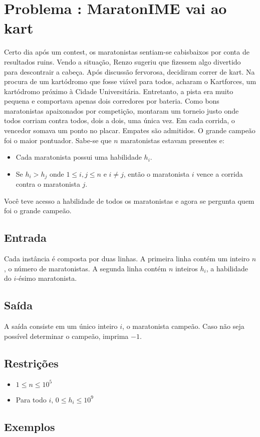 \section*{Problema \proxLetra: MaratonIME vai ao kart}

Certo dia após um contest, os maratonistas sentiam-se cabisbaixos por conta de resultados ruins. Vendo a situação, Renzo sugeriu que fizessem algo divertido para descontrair a cabeça. Após discussão fervorosa, decidiram correr de kart. Na procura de um kartódromo que fosse viável para todos, acharam o Kartforces, um kartódromo próximo à Cidade Universitária. Entretanto, a pista era muito pequena e comportava apenas dois corredores por bateria. Como bons maratonistas apaixonados por competição, montaram um torneio justo onde todos corriam contra todos, dois a dois, uma única vez. Em cada corrida, o vencedor somava um ponto no placar. Empates são admitidos. O grande campeão foi o maior pontuador. Sabe-se que $n$ maratonistas estavam presentes e:

\begin{itemize}
	\item Cada maratonista possui uma habilidade $h_i$.
	\item Se $h_i > h_j$ onde $1 \leq i,j \leq n$ e $i \neq j$, então o maratonista $i$ vence a corrida contra o maratonista $j$.
\end{itemize}

Você teve acesso a habilidade de todos os maratonistas e agora se pergunta quem foi o grande campeão.

\subsection*{Entrada}

Cada instância é composta por duas linhas. 
A primeira linha contém um inteiro $n$, o número de maratonistas.
A segunda linha contém $n$ inteiros $h_i$, a habilidade do $i$-ésimo maratonista. 


\subsection*{Saída}

A saída consiste em um único inteiro $i$, o maratonista campeão. Caso não seja possível determinar o campeão, imprima $-1$.


\subsection*{Restrições}
\begin{itemize}
  \item $1 \leq n \leq 10^5$
  \item Para todo $i$, $0 \leq h_i \leq 10^9$
\end{itemize}

\subsection*{Exemplos}

\begin{center}
\end{center}
